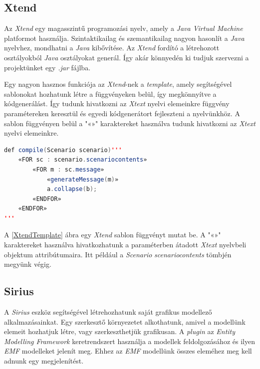 \subsection{Xtend}

Az \textit{Xtend} \cite{Xtend} egy magasszintű programozási nyelv, amely a \textit{Java Virtual Machine} platformot használja.
Szintaktikailag és szemantikailag nagyon hasonlít a \textit{Java} nyelvhez, mondhatni a \textit{Java} kibővítése.
Az \textit{Xtend} fordító a létrehozott osztályokból \textit{Java} osztályokat generál.
Így akár könnyedén ki tudjuk szervezni a projektünket egy \textit{.jar} fájlba.

Egy nagyon hasznos funkciója az \textit{Xtend}-nek a \textit{template}, amely segítségével sablonokat hozhatunk létre a függvényeken belül, így megkönnyítve a kódgenerálást.
Így tudunk hivatkozni az \textit{Xtext} nyelvi elemeinkre függvény paramétereken keresztül és egyedi kódgenerátort fejleszteni a nyelvünkhöz.
A sablon függvényen belül a "«»" karaktereket használva tudunk hivatkozni az \textit{Xtext} nyelvi elemeinkre.

\begin{lstlisting}[language=java, frame=single, float=ht!, caption={Xtend template.},captionpos=b, label=XtendTemplate]
def compile(Scenario scenario)'''
	«FOR sc : scenario.scenariocontents»
		«FOR m : sc.message»
			«generateMessage(m)»
			a.collapse(b);
		«ENDFOR»
	«ENDFOR»
'''
\end{lstlisting}

A \ref{XtendTemplate} ábra egy \textit{Xtend} sablon függvényt mutat be.
A "«»" karaktereket használva hivatkozhatunk a paraméterben átadott \textit{Xtext} nyelvbeli objektum attribútumaira.
Itt például a \textit{Scenario} \textit{scenariocontents} tömbjén megyünk végig.

\subsection{Sirius}

A \textit{Sirius} \cite{Sirius} eszköz segítségével létrehozhatunk saját grafikus modellező alkalmazásainkat.
Egy szerkesztő környezetet alkothatunk, amivel a modellünk elemeit hozhatjuk létre, vagy szerkeszthetjük grafikusan.
A \textit{plugin} az \textit{Entity Modelling Framework} \cite{EMF} keretrendszert használja a modellek feldolgozásához és ilyen \textit{EMF} modelleket jelenít meg.
Ehhez az \textit{EMF} modellünk összes eleméhez meg kell adnunk egy megjelenítést.

